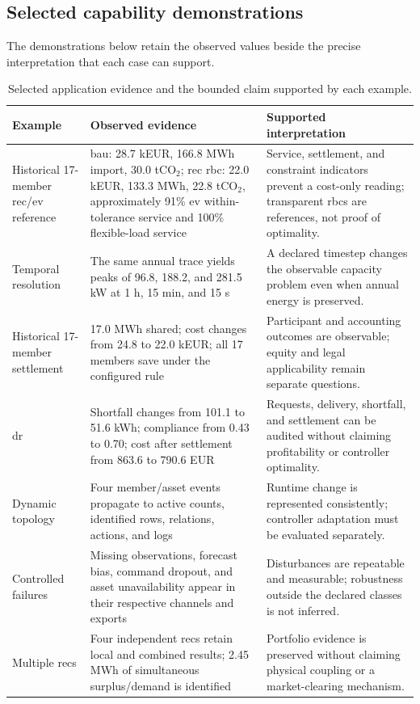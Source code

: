 \subsection{Selected capability demonstrations}

The demonstrations below retain the observed values beside the precise interpretation that each case can support.

\begin{table}[H]
\centering
\caption{Selected application evidence and the bounded claim supported by each example.}
\label{tab:sim-application-evidence}
\scriptsize
\begin{tabularx}{\textwidth}{@{}p{}p{}X@{}}
\toprule
\textbf{Example} & \textbf{Observed evidence} & \textbf{Supported interpretation} \\
\midrule
Historical 17-member \gls{rec}/\gls{ev} reference & \gls{bau}: 28.7 kEUR, 166.8 MWh import, 30.0 tCO$_2$; \gls{rec} \gls{rbc}: 22.0 kEUR, 133.3 MWh, 22.8 tCO$_2$, approximately 91\% \gls{ev} within-tolerance service and 100\% flexible-load service & Service, settlement, and constraint indicators prevent a cost-only reading; transparent \glspl{rbc} are references, not proof of optimality. \\
Temporal resolution & The same annual trace yields peaks of 96.8, 188.2, and 281.5 kW at 1 h, 15 min, and 15 s & A declared timestep changes the observable capacity problem even when annual energy is preserved. \\
Historical 17-member settlement & 17.0 MWh shared; cost changes from 24.8 to 22.0 kEUR; all 17 members save under the configured rule & Participant and accounting outcomes are observable; equity and legal applicability remain separate questions. \\
\gls{dr} & Shortfall changes from 101.1 to 51.6 kWh; compliance from 0.43 to 0.70; cost after settlement from 863.6 to 790.6 EUR & Requests, delivery, shortfall, and settlement can be audited without claiming profitability or controller optimality. \\
Dynamic topology & Four member/asset events propagate to active counts, identified rows, relations, actions, and logs & Runtime change is represented consistently; controller adaptation must be evaluated separately. \\
Controlled failures & Missing observations, forecast bias, command dropout, and asset unavailability appear in their respective channels and exports & Disturbances are repeatable and measurable; robustness outside the declared classes is not inferred. \\
Multiple \glspl{rec} & Four independent \glspl{rec} retain local and combined results; 2.45 MWh of simultaneous surplus/demand is identified & Portfolio evidence is preserved without claiming physical coupling or a market-clearing mechanism. \\
\bottomrule
\end{tabularx}
\end{table}

